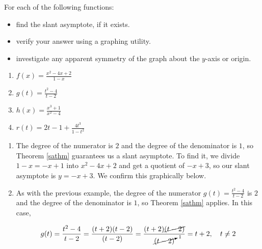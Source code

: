 \documentclass{ximera}
\begin{document}
\begin{example} \label{saexample}  For each of the following functions:

\begin{itemize}

\item find the slant asymptote, if it exists.

\item  verify your answer using a graphing utility.

\item  investigate any apparent symmetry of the graph about the $y$-axis or origin.

\end{itemize}

\begin{enumerate}

\item  $f(x) = \frac{x^2-4x+2}{1-x}$  

\item  \label{sacancel} $g(t) = \frac{t^2-4}{t-2}$


\item  $h(x) = \frac{x^3+1}{x^2-4}$

\item  $r(t) = 2t-1+\frac{4t^3}{1-t^2}$ 


\end{enumerate}

\begin{explanation}

\begin{enumerate}

\item  The degree of the numerator is $2$ and the degree of the denominator is $1$, so Theorem \ref{sathm} guarantees us a slant asymptote.  To find it, we divide $1-x = -x+1$ into $x^2-4x+2$ and get a quotient of $-x+3$, so our slant asymptote is $y=-x+3$.  We confirm this graphically below.
\begin{center}
\end{center} 

\item  As with the previous example, the degree of the numerator $g(t) = \frac{t^2-4}{t-2}$ is $2$ and the degree of the denominator is $1$, so Theorem \ref{sathm} applies.  In this case, 

\[ g(t) = \frac{t^2-4}{t-2} = \frac{(t+2)(t-2)}{(t-2)} = \frac{(t+2) \cancel{(t-2)}}{\cancelto{1}{(t-2)}} = t+2, \quad t \neq 2\]


\end{enumerate}
\end{explanation}
\end{example}
\end{document}

